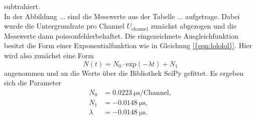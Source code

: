subtrahiert.
\\
In der Abbildung ... sind die Messwerte aus der Tabelle ... aufgetrage. Dabei wurde die Untergrundrate pro Channel $U_{\text{channel}}$ zunächst abgezogen und die Messwerte dann
poissonfehlerbehaftet. Die eingezeichnete Ausgleichfunktion besitzt die Form einer Exponentialfunktion wie in Gleichung \ref{{eqn:lololol}}. Hier wird also zunächst eine Form 
\begin{equation*}
N(t) = N_0 \cdot \text{exp}(-\lambda t) + N_1
\end{equation*}
angenommen und an die Werte über die Bibliothek SciPy \cite{scipy} gefittet.
Es ergeben sich die Parameter
\begin{align*}
    N_0 &= \SI{0.0223}{\micro\second\per{\text{Channel}}},\\
    N_1 &= \SI{-0.0148}{\micro\second},\\
    \lambda &= \SI{-0.0148}{\micro\second}.\\
\end{align*}